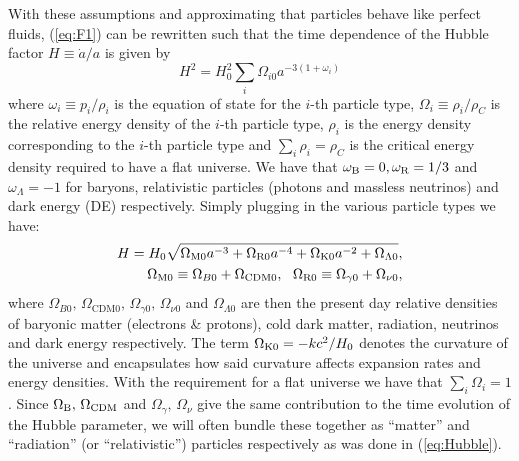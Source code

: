 \documentclass[%
reprint,
 amsmath,amssymb,
 aps,
]{revtex4-2}
\begin{document}
With these assumptions and approximating that particles behave like perfect fluids, (\ref{eq:F1}) can be rewritten such that the time dependence of the Hubble factor $H\equiv\dot{a}/a$ is given by 
\[H^2=H_0^2\sum_i\Omega_{i0}a^{-3(1+\omega_i)}\]
where $\omega_i\equiv p_i/\rho_i$ is the equation of state for the $i$-th particle type, $\Omega_i\equiv\rho_i/\rho_C$ is the relative energy density of the $i$-th particle type, $\rho_i$ is the energy density corresponding to the $i$-th particle type and $\sum_i\rho_i=\rho_C$ is the critical energy density required to have a flat universe. We have that $\omega_{\text B}=0,\omega_{\text{R}}=1/3$ and $\omega_\Lambda=-1$ for baryons, relativistic particles (photons and massless neutrinos) and dark energy (DE) respectively. Simply plugging in the various particle types we have:
\begin{align}
	H=H_0\sqrt{\Omega_{\text M0}a^{-3}+\Omega_{\text{R}0}a^{-4}+\Omega_{\text K0}a^{-2}+\Omega_{\Lambda0}}, \label{eq:Hubble}\\
	\Omega_{\text M0}\equiv \Omega_{B0}+\Omega_{\text{CDM}0},~~\Omega_{\text{R}0}\equiv \Omega_{\gamma0}+\Omega_{\nu0},\nonumber
\end{align}
where $\Omega_{B0},\,\Omega_{\text{CDM}0},\,\Omega_{\gamma0},\,\Omega_{\nu0}$ and $\Omega_{\Lambda0}$ are then the present day relative densities of baryonic matter (electrons \& protons), cold dark matter, radiation, neutrinos and dark energy respectively. The term $\Omega_{\text K0}=-kc^2/H_0$ denotes the curvature of the universe and encapsulates how said curvature affects expansion rates and energy densities. With the requirement for a flat universe we have that $\sum_i\Omega_i=1$. Since $\Omega_{\text B},\,\Omega_{\text{CDM}}$ and $\Omega_\gamma,\,\Omega_\nu$ give the same contribution to the time evolution of the Hubble parameter, we will often bundle these together as ``matter'' and ``radiation'' (or ``relativistic'') particles respectively as was done in (\ref{eq:Hubble}).
\end{document}

